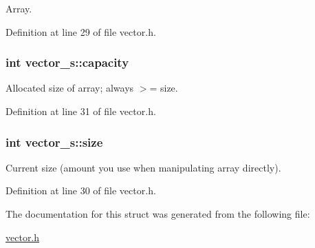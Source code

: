 Array. 



Definition at line 29 of file vector.h.

\hypertarget{structvector__s_a8db5892656cbc148d5bf3b8fcb144df9}{
\subsubsection[{capacity}]{\setlength{\rightskip}{0pt plus 5cm}int {\bf vector\_\-s::capacity}}}
\label{structvector__s_a8db5892656cbc148d5bf3b8fcb144df9}


Allocated size of array; always $>$= size. 



Definition at line 31 of file vector.h.

\hypertarget{structvector__s_a817205845ca0191af990f05b62e587b9}{
\subsubsection[{size}]{\setlength{\rightskip}{0pt plus 5cm}int {\bf vector\_\-s::size}}}
\label{structvector__s_a817205845ca0191af990f05b62e587b9}


Current size (amount you use when manipulating array directly). 



Definition at line 30 of file vector.h.



The documentation for this struct was generated from the following file:\begin{DoxyCompactItemize}
\item 
\hyperlink{vector_8h}{vector.h}\end{DoxyCompactItemize}
